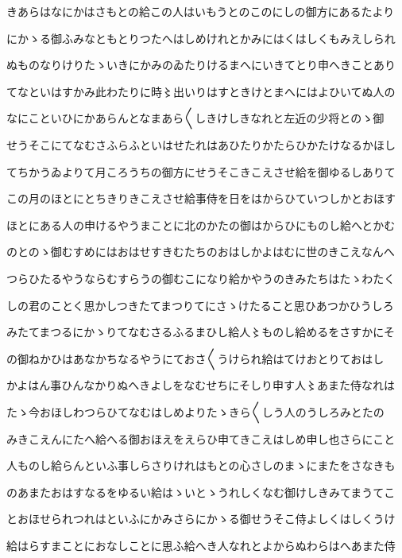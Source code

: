 \documentclass[a4paper,11pt,landscape]{ltjtarticle}
\begin{document}
\par\medskip
きあらはなにかはさもとの給この人はいもうとのこのにしの御方にあるたより
\par\medskip
にかゝる御ふみなともとりつたへはしめけれとかみにはくはしくもみえしられ
\par\medskip
ぬものなりけりたゝいきにかみのゐたりけるまへにいきてとり申へきことあり
\par\medskip
てなといはすかみ此わたりに時〻出いりはすときけとまへにはよひいてぬ人の
\par\medskip
なにこといひにかあらんとなまあら〱しきけしきなれと左近の少将とのゝ御
\par\medskip
せうそこにてなむさふらふといはせたれはあひたりかたらひかたけなるかほし
\par\medskip
てちかうゐよりて月ころうちの御方にせうそこきこえさせ給を御ゆるしありて
\par\medskip
この月のほとにとちきりきこえさせ給事侍を日をはからひていつしかとおほす
\par\medskip
ほとにある人の申けるやうまことに北のかたの御はからひにものし給へとかむ
\par\medskip
のとのゝ御むすめにはおはせすきむたちのおはしかよはむに世のきこえなんへ
\par\medskip
つらひたるやうならむすらうの御むこになり給かやうのきみたちはたゝわたく
\par\medskip
しの君のことく思かしつきたてまつりてにさゝけたること思ひあつかひうしろ
\par\medskip
みたてまつるにかゝりてなむさるふるまひし給人〻ものし給めるをさすかにそ
\par\medskip
の御ねかひはあなかちなるやうにておさ〱うけられ給はてけおとりておはし
\par\medskip
かよはん事ひんなかりぬへきよしをなむせちにそしり申す人〻あまた侍なれは
\par\medskip
たゝ今おほしわつらひてなむはしめよりたゝきら〱しう人のうしろみとたの
\par\medskip
みきこえんにたへ給へる御おほえをえらひ申てきこえはしめ申し也さらにこと
\par\medskip
人ものし給らんといふ事しらさりけれはもとの心さしのまゝにまたをさなきも
\par\medskip
のあまたおはすなるをゆるい給はゝいとゝうれしくなむ御けしきみてまうてこ
\par\medskip
とおほせられつれはといふにかみさらにかゝる御せうそこ侍よしくはしくうけ
\par\medskip
給はらすまことにおなしことに思ふ給へき人なれとよからぬわらはへあまた侍
\par\medskip
\end{document}
